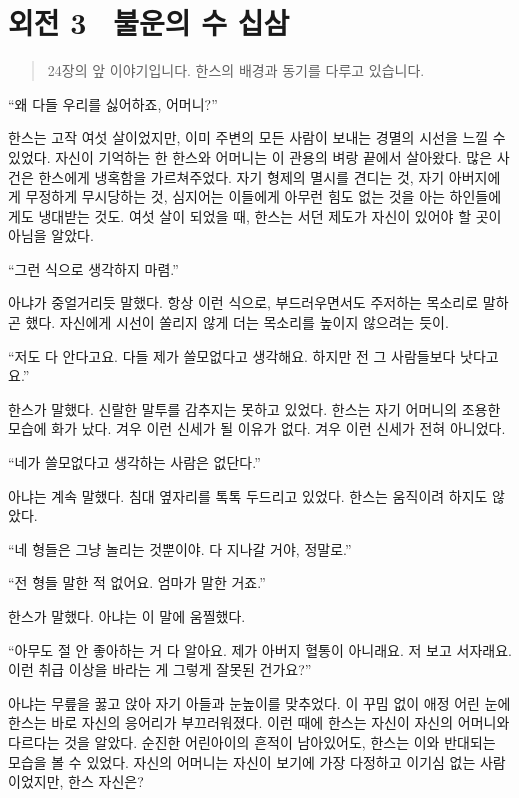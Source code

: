 

\chapter[외전3. 불운의 수 십삼][외전 3\hspace*{.5em}불운의 수 십삼]{외전 3 \ 불운의 수 십삼}



\begin{quote}

\small 24장의 앞 이야기입니다. 한스의 배경과 동기를 다루고 있습니다.

\end{quote} %

``왜 다들 우리를 싫어하죠, 어머니?''

한스는 고작 여섯 살이었지만, 이미 주변의 모든 사람이 보내는 경멸의 시선을 느낄 수 있었다. 자신이 기억하는 한 한스와 어머니는 이 관용의 벼랑 끝에서 살아왔다. 많은 사건은 한스에게 냉혹함을 가르쳐주었다. 자기 형제의 멸시를 견디는 것, 자기 아버지에게 무정하게 무시당하는 것, 심지어는 이들에게 아무런 힘도 없는 것을 아는 하인들에게도 냉대받는 것도. 여섯 살이 되었을 때, 한스는 서던 제도가 자신이 있어야 할 곳이 아님을 알았다.

``그런 식으로 생각하지 마렴.''

아냐가 중얼거리듯 말했다. 항상 이런 식으로, 부드러우면서도 주저하는 목소리로 말하곤 했다. 자신에게 시선이 쏠리지 않게 더는 목소리를 높이지 않으려는 듯이.

``저도 다 안다고요. 다들 제가 쓸모없다고 생각해요. 하지만 전 그 사람들보다 낫다고요.''

한스가 말했다. 신랄한 말투를 감추지는 못하고 있었다. 한스는 자기 어머니의 조용한 모습에 화가 났다. 겨우 이런 신세가 될 이유가 없다. 겨우 이런 신세가 전혀 아니었다.

``네가 쓸모없다고 생각하는 사람은 없단다.''

아냐는 계속 말했다. 침대 옆자리를 톡톡 두드리고 있었다. 한스는 움직이려 하지도 않았다.

``네 형들은 그냥 놀리는 것뿐이야. 다 지나갈 거야, 정말로.''

``전 형들 말한 적 없어요. 엄마가 말한 거죠.''

한스가 말했다. 아냐는 이 말에 움찔했다.

``아무도 절 안 좋아하는 거 다 알아요. 제가 아버지 혈통이 아니래요. 저 보고 서자래요. 이런 취급 이상을 바라는 게 그렇게 잘못된 건가요?''

아냐는 무릎을 꿇고 앉아 자기 아들과 눈높이를 맞추었다. 이 꾸밈 없이 애정 어린 눈에 한스는 바로 자신의 응어리가 부끄러워졌다. 이런 때에 한스는 자신이 자신의 어머니와 다르다는 것을 알았다. 순진한 어린아이의 흔적이 남아있어도, 한스는 이와 반대되는 모습을 볼 수 있었다. 자신의 어머니는 자신이 보기에 가장 다정하고 이기심 없는 사람이었지만, 한스 자신은?

